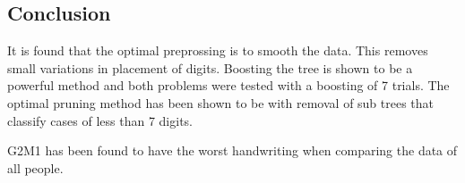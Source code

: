 \subsection{Conclusion}

It is found that the optimal preprossing is to smooth the data. 
This removes small variations in placement of digits.
Boosting the tree is shown to be a powerful method and both problems were tested with a boosting of 7 trials.
The optimal pruning method has been shown to be with removal of sub trees that classify cases of less than 7 digits.

G2M1
has been found to have the worst handwriting when comparing the data of all people.

